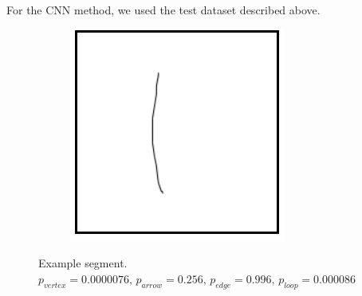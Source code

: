 For the CNN method, we used the test dataset described above.

\begin{figure}
	\centering
	\begin{subfigure}{0.45\textwidth}
		\centering
		\includegraphics[scale=0.5]{./img/classificationexample}
	\end{subfigure}
	\caption{Example segment. $p_{vertex} = 0.0000076\text{, }   p_{arrow} = 0.256\text{, } p_{edge} = 0.996\text{, }  p_{loop} = 0.000086$}
	\label{fig:classification_example}
\end{figure}

%
%


